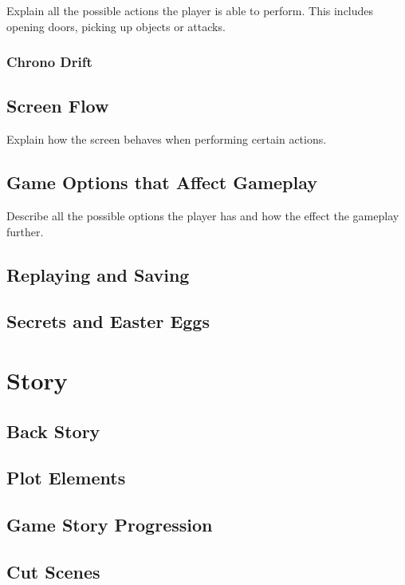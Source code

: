 \documentclass[12pt]{article}
\begin{document}
Explain all the possible actions the player is able to perform. This includes opening doors, picking up objects or attacks.

\subsubsection{Chrono Drift}

\subsection{Screen Flow}

Explain how the screen behaves when performing certain actions.

\subsection{Game Options that Affect Gameplay}

Describe all the possible options the player has and how the effect the gameplay further. 

\subsection{Replaying and Saving}

\subsection{Secrets and Easter Eggs}

\section{Story}

\subsection{Back Story}

\subsection{Plot Elements}

\subsection{Game Story Progression}

\subsection{Cut Scenes}
\end{document}
